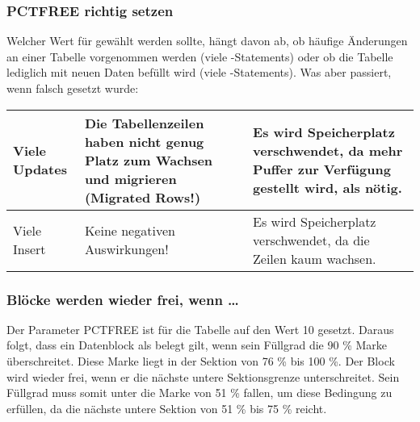         \subsubsection{PCTFREE richtig setzen}
          Welcher Wert f\"ur  gew\"ahlt werden sollte, h\"angt davon ab, ob h\"aufige \"Anderungen an einer Tabelle vorgenommen werden (viele -Statements) oder ob die Tabelle lediglich mit neuen Daten bef\"ullt wird (viele -Statements). Was aber passiert, wenn  falsch gesetzt wurde:
          \begin{center}
            \begin{small}
              \tabletail{
                \hline
              }
              \begin{supertabular}[h]{|l|p{5cm}|p{5cm}|}
                Viele Updates & Die Tabellenzeilen haben nicht genug Platz zum Wachsen und migrieren (Migrated Rows!) & Es wird Speicherplatz verschwendet, da mehr Puffer zur Verf\"ugung gestellt wird, als n\"otig. \\
                \hline
                Viele Insert & Keine negativen Auswirkungen! & Es wird Speicherplatz verschwendet, da die Zeilen kaum wachsen. \\
              \end{supertabular}
            \end{small}
          \end{center}
        \subsubsection{Bl\"ocke werden wieder frei, wenn \dots}
          Der Parameter PCTFREE ist f\"ur die Tabelle  auf den Wert 10 gesetzt. Daraus folgt, dass ein Datenblock als belegt gilt, wenn sein F\"ullgrad die 90 \% Marke \"uberschreitet. Diese Marke liegt in der Sektion von 76 \% bis 100 \%. Der Block wird wieder frei, wenn er die n\"achste untere Sektionsgrenze unterschreitet. Sein F\"ullgrad muss somit unter die Marke von 51 \% fallen, um diese Bedingung zu erf\"ullen, da die n\"achste untere Sektion von 51 \% bis 75 \% reicht.

